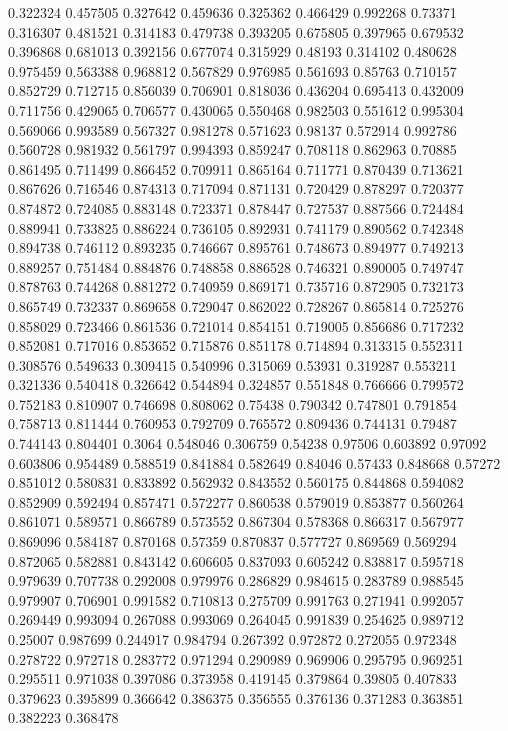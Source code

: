 0.322324 0.457505
0.327642 0.459636
0.325362 0.466429
0.992268 0.73371
0.316307 0.481521
0.314183 0.479738
0.393205 0.675805
0.397965 0.679532
0.396868 0.681013
0.392156 0.677074
0.315929 0.48193
0.314102 0.480628
0.975459 0.563388
0.968812 0.567829
0.976985 0.561693
0.85763 0.710157
0.852729 0.712715
0.856039 0.706901
0.818036 0.436204
0.695413 0.432009
0.711756 0.429065
0.706577 0.430065
0.550468 0.982503
0.551612 0.995304
0.569066 0.993589
0.567327 0.981278
0.571623 0.98137
0.572914 0.992786
0.560728 0.981932
0.561797 0.994393
0.859247 0.708118
0.862963 0.70885
0.861495 0.711499
0.866452 0.709911
0.865164 0.711771
0.870439 0.713621
0.867626 0.716546
0.874313 0.717094
0.871131 0.720429
0.878297 0.720377
0.874872 0.724085
0.883148 0.723371
0.878447 0.727537
0.887566 0.724484
0.889941 0.733825
0.886224 0.736105
0.892931 0.741179
0.890562 0.742348
0.894738 0.746112
0.893235 0.746667
0.895761 0.748673
0.894977 0.749213
0.889257 0.751484
0.884876 0.748858
0.886528 0.746321
0.890005 0.749747
0.878763 0.744268
0.881272 0.740959
0.869171 0.735716
0.872905 0.732173
0.865749 0.732337
0.869658 0.729047
0.862022 0.728267
0.865814 0.725276
0.858029 0.723466
0.861536 0.721014
0.854151 0.719005
0.856686 0.717232
0.852081 0.717016
0.853652 0.715876
0.851178 0.714894
0.313315 0.552311
0.308576 0.549633
0.309415 0.540996
0.315069 0.53931
0.319287 0.553211
0.321336 0.540418
0.326642 0.544894
0.324857 0.551848
0.766666 0.799572
0.752183 0.810907
0.746698 0.808062
0.75438 0.790342
0.747801 0.791854
0.758713 0.811444
0.760953 0.792709
0.765572 0.809436
0.744131 0.79487
0.744143 0.804401
0.3064 0.548046
0.306759 0.54238
0.97506 0.603892
0.97092 0.603806
0.954489 0.588519
0.841884 0.582649
0.84046 0.57433
0.848668 0.57272
0.851012 0.580831
0.833892 0.562932
0.843552 0.560175
0.844868 0.594082
0.852909 0.592494
0.857471 0.572277
0.860538 0.579019
0.853877 0.560264
0.861071 0.589571
0.866789 0.573552
0.867304 0.578368
0.866317 0.567977
0.869096 0.584187
0.870168 0.57359
0.870837 0.577727
0.869569 0.569294
0.872065 0.582881
0.843142 0.606605
0.837093 0.605242
0.838817 0.595718
0.979639 0.707738
0.292008 0.979976
0.286829 0.984615
0.283789 0.988545
0.979907 0.706901
0.991582 0.710813
0.275709 0.991763
0.271941 0.992057
0.269449 0.993094
0.267088 0.993069
0.264045 0.991839
0.254625 0.989712
0.25007 0.987699
0.244917 0.984794
0.267392 0.972872
0.272055 0.972348
0.278722 0.972718
0.283772 0.971294
0.290989 0.969906
0.295795 0.969251
0.295511 0.971038
0.397086 0.373958
0.419145 0.379864
0.39805 0.407833
0.379623 0.395899
0.366642 0.386375
0.356555 0.376136
0.371283 0.363851
0.382223 0.368478
